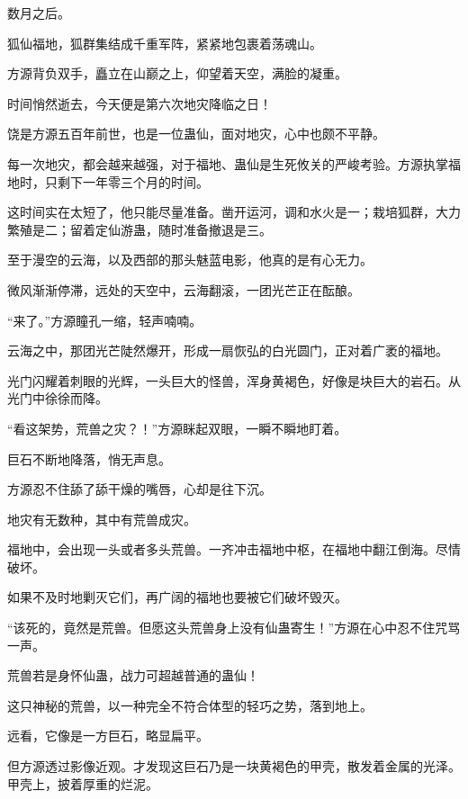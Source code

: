 
\begin{this_body}



数月之后。

狐仙福地，狐群集结成千重军阵，紧紧地包裹着荡魂山。

方源背负双手，矗立在山巅之上，仰望着天空，满脸的凝重。

时间悄然逝去，今天便是第六次地灾降临之日！

饶是方源五百年前世，也是一位蛊仙，面对地灾，心中也颇不平静。

每一次地灾，都会越来越强，对于福地、蛊仙是生死攸关的严峻考验。方源执掌福地时，只剩下一年零三个月的时间。

这时间实在太短了，他只能尽量准备。凿开运河，调和水火是一；栽培狐群，大力繁殖是二；留着定仙游蛊，随时准备撤退是三。

至于漫空的云海，以及西部的那头魅蓝电影，他真的是有心无力。

微风渐渐停滞，远处的天空中，云海翻滚，一团光芒正在酝酿。

“来了。”方源瞳孔一缩，轻声喃喃。

云海之中，那团光芒陡然爆开，形成一扇恢弘的白光圆门，正对着广袤的福地。

光门闪耀着刺眼的光辉，一头巨大的怪兽，浑身黄褐色，好像是块巨大的岩石。从光门中徐徐而降。

“看这架势，荒兽之灾？！”方源眯起双眼，一瞬不瞬地盯着。

巨石不断地降落，悄无声息。

方源忍不住舔了舔干燥的嘴唇，心却是往下沉。

地灾有无数种，其中有荒兽成灾。

福地中，会出现一头或者多头荒兽。一齐冲击福地中枢，在福地中翻江倒海。尽情破坏。

如果不及时地剿灭它们，再广阔的福地也要被它们破坏毁灭。

“该死的，竟然是荒兽。但愿这头荒兽身上没有仙蛊寄生！”方源在心中忍不住咒骂一声。

荒兽若是身怀仙蛊，战力可超越普通的蛊仙！

这只神秘的荒兽，以一种完全不符合体型的轻巧之势，落到地上。

远看，它像是一方巨石，略显扁平。

但方源透过影像近观。才发现这巨石乃是一块黄褐色的甲壳，散发着金属的光泽。甲壳上，披着厚重的烂泥。


\end{this_body}
